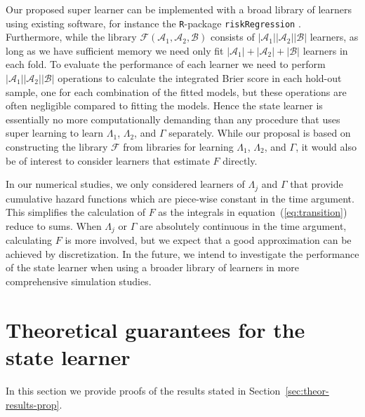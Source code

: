 \documentclass[a4,danish]{article}
\begin{document}
Our proposed super learner can be implemented with a broad library of learners
using existing software, for instance the \texttt{R}-package
\texttt{riskRegression} \citep{Gerds_Ohlendorff_Ozenne_2023}. Furthermore, while
the library \( \mathcal{F}(\mathcal{A}_1,\mathcal{A}_2,\mathcal{B}) \) consists
of \( |\mathcal{A}_1||\mathcal{A}_2||\mathcal{B}| \) learners, as long as we
have sufficient memory we need only fit
\( |\mathcal{A}_1| +|\mathcal{A}_2| + |\mathcal{B}| \) learners in each fold. To
evaluate the performance of each learner we need to perform
\( |\mathcal{A}_1||\mathcal{A}_2||\mathcal{B}| \) operations to calculate the
integrated Brier score in each hold-out sample, one for each combination of the
fitted models, but these operations are often negligible compared to fitting the
models. Hence the state learner is essentially no more computationally demanding
than any procedure that uses super learning to learn $\Lambda_1$, $\Lambda_2$,
and $\Gamma$ separately. While our proposal is based on constructing the library
\( \mathcal{F} \) from libraries for learning \( \Lambda_1 \), $\Lambda_2$, and
$\Gamma$, it would also be of interest to consider learners that estimate
\( F \) directly.

In our numerical studies, we only considered learners of $\Lambda_j$ and
$\Gamma$ that provide cumulative hazard functions which are piece-wise constant
in the time argument. This simplifies the calculation of \( F \) as the
integrals in equation~(\ref{eq:transition}) reduce to sums. When $\Lambda_j$ or
\( \Gamma \) are absolutely continuous in the time argument, calculating \( F \)
is more involved, but we expect that a good approximation can be achieved by
discretization. In the future, we intend to investigate the performance of the
state learner when using a broader library of learners in more comprehensive
simulation studies.

% 

\appendix

\section{Theoretical guarantees for the state learner}
\label{sec:proof-proposition}

In this section we provide proofs of the results stated in
Section~\ref{sec:theor-results-prop}.
\end{document}
